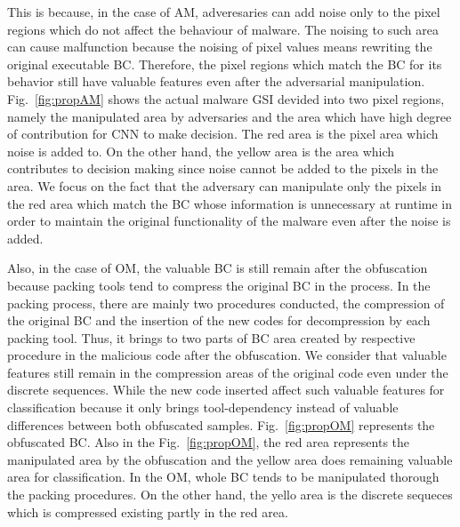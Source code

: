 \documentclass{ieeeaccess}
\newcommand{\myfigurename}{Fig.}
\begin{document}
This is because, in the case of AM, adveresaries can add noise only to the pixel regions which do not affect the behaviour of malware.
The noising to such area can cause malfunction because the noising of pixel values means rewriting the original executable BC.
Therefore, the pixel regions which match the BC for its behavior still have valuable features even after the adversarial manipulation.
\myfigurename~\ref{fig:propAM} shows the actual malware GSI devided into two pixel regions, namely the manipulated area by adversaries and the area which have high degree of contribution for CNN to make decision.
The red area is the pixel area which noise is added to.
On the other hand, the yellow area is the area which contributes to decision making since noise cannot be added to the pixels in the area.
We focus on the fact that the adversary can manipulate only the pixels in the red area which match the BC whose information is unnecessary at runtime in order to maintain the original functionality of the malware even after the noise is added.

Also, in the case of OM, the valuable BC is still remain after the obfuscation because packing tools tend to compress the original BC in the process.
In the packing process, there are mainly two procedures conducted, the compression of the original BC and the insertion of the new codes for decompression by each packing tool. %
Thus, it brings to two parts of BC area created by respective procedure in the malicious code after the obfuscation. %
We consider that valuable features still remain in the compression areas of the original code even under the discrete sequences.
While the new code inserted affect such valuable features for classification because it only brings tool-dependency instead of valuable differences between both obfuscated samples.
\myfigurename~\ref{fig:propOM} represents the obfuscated BC.
Also in the \myfigurename~\ref{fig:propOM}, the red area represents the manipulated area by the obfuscation and the yellow area does remaining valuable area for classification.
In the OM, whole BC tends to be manipulated thorough the packing procedures.
On the other hand, the yello area is the discrete sequeces which is compressed existing partly in the red area.
\end{document}
